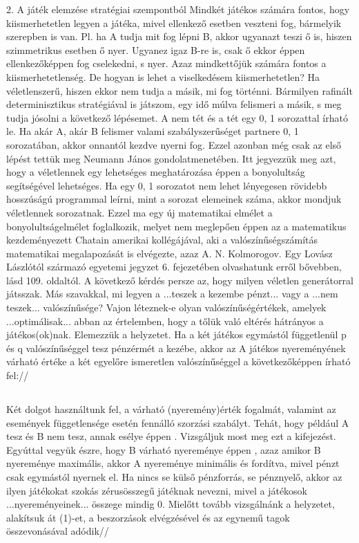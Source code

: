 \documentclass  {article}
\begin{document}
2. A játék elemzése stratégiai szempontból
Mindkét játékos számára fontos, hogy kiismerhetetlen legyen a játéka, mivel ellenkező esetben veszteni fog, bármelyik szerepben is van. Pl. ha A tudja mit fog lépni B, akkor ugyanazt teszi ő is, hiszen szimmetrikus esetben ő nyer. Ugyanez igaz B-re is, csak ő ekkor éppen ellenkezőképpen fog cselekedni, s nyer. Azaz mindkettőjük számára fontos a kiismerhetetlenség. De hogyan is lehet a viselkedésem kiismerhetetlen? Ha véletlenszerű, hiszen ekkor nem tudja a másik, mi fog történni. Bármilyen rafinált determinisztikus stratégiával is játszom, egy idő múlva felismeri a másik, s meg tudja jósolni a következő lépésemet. A nem tét és a tét egy 0, 1 sorozattal írható le. Ha akár A, akár B felismer valami szabályszerűséget partnere 0, 1 sorozatában, akkor onnantól kezdve nyerni fog. Ezzel azonban még csak az első lépést tettük meg Neumann János gondolatmenetében. Itt jegyezzük meg azt, hogy a véletlennek egy lehetséges meghatározása éppen a bonyolultság segítségével lehetséges. Ha egy 0, 1 sorozatot nem lehet lényegesen rövidebb hosszúságú programmal leírni, mint a sorozat elemeinek száma, akkor mondjuk véletlennek sorozatnak. Ezzel ma egy új matematikai elmélet a bonyolultságelmélet foglalkozik, melyet nem meglepően éppen az a matematikus kezdeményezett Chatain amerikai kollégájával, aki a valószínűségszámítás matematikai megalapozását is elvégezte, azaz A. N. Kolmorogov. Egy Lovász Lászlótól származó egyetemi jegyzet 6. fejezetében olvashatunk erről bővebben, lásd  \cite{lovasz} 109. oldaltól.
A következő kérdés persze az, hogy milyen véletlen generátorral játsszak. Más szavakkal, mi legyen a ...teszek a kezembe pénzt... vagy a ...nem teszek... valószínűsége? Vajon léteznek-e olyan valószínűségértékek, amelyek ...optimálisak... abban az értelemben, hogy a tőlük való eltérés hátrányos a játékos(ok)nak. Elemezzük a helyzetet. Ha a két játékos egymástól függetlenül p és q valószínűséggel tesz pénzérmét a kezébe, akkor az A játékos nyereményének várható értéke a két egyelőre ismeretlen valószínűséggel a következőképpen írható fel://
\subsection{}                        
Két dolgot használtunk fel, a várható (nyeremény)érték fogalmát, valamint az események függetlensége esetén fennálló szorzási szabályt. Tehát, hogy például A tesz és B nem tesz, annak esélye éppen    . Vizsgáljuk most meg ezt a kifejezést.
Egyúttal vegyük észre, hogy B várható nyereménye éppen  , azaz amikor B nyereménye maximális, akkor A nyereménye minimális és fordítva, mivel pénzt csak egymástól nyernek el. Ha nincs se külső pénzforrás, se pénznyelő, akkor az ilyen játékokat szokás zérusösszegű játéknak nevezni, mivel a játékosok ...nyereményeinek... összege mindig 0. Mielőtt tovább vizsgálnánk a helyzetet, alakítsuk át (1)-et, a beszorzások elvégzésével és az egynemű tagok összevonásával adódik//
\end{document}
